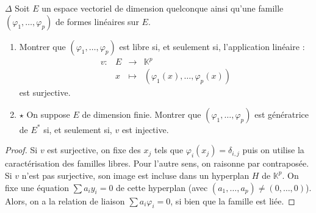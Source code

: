 \documentclass[french,a4paper]{article}
\newcommand{\K}{\mathbb{K}}
\newcommand{\st}{^*}
\theoremstyle{plain}
\theoremstyle{definition}
\theoremstyle{remark}
\begin{document}
\begin{ex}[Moulin.EV.42]{$\Delta$} Soit $E$ un espace vectoriel de dimension quelconque ainsi qu'une famille $(\varphi_1,\ldots,\varphi_p)$ de formes linéaires sur $E$.
	\begin{enumerate}
		\item Montrer que $(\varphi_1,\ldots,\varphi_p)$ est libre si, et seulement si, l'application linéaire : $$\begin{array}{lrcl}
			v:&E&\longrightarrow&\K^p \\
			&x&\longmapsto&(\varphi_1(x),\ldots,\varphi_p(x))
		\end{array}$$ est surjective.
		\item $\star$ On suppose $E$ de dimension finie. Montrer que $(\varphi_1,\ldots,\varphi_p)$ est génératrice de $E\st$ si, et seulement si, $v$ est injective.
	\end{enumerate}
\end{ex}\begin{proof}
	Si $v$ est surjective, on fixe des $x_j$ tels que $\varphi_i(x_j)=\delta_{i,j}$ puis on utilise la caractérisation des familles libres. Pour l'autre sens, on raisonne par contraposée. Si $v$ n'est pas surjective, son image est incluse dans un hyperplan $H$ de $\K^p$.  On fixe une équation $\sum a_iy_i=0$ de cette hyperplan (avec $(a_1,\ldots,a_p)\ne(0,\ldots,0)$). Alors, on a la relation de liaison $\sum a_i\varphi_i=0$, si bien que la famille est liée.
\end{proof}
\end{document}
